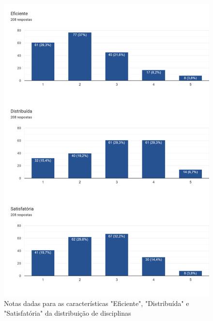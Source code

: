         \begin{figure}[htbp]
            \centering
            \caption{\label{fig:6.0-Opiniao-4_6}Notas dadas para as características "Eficiente", "Distribuída" e "Satisfatória" da distribuição de disciplinas}
            \includegraphics[scale=0.4]{files/img/Forms/6.0-Opiniao-4_6.png}
        \end{figure}

        
        
